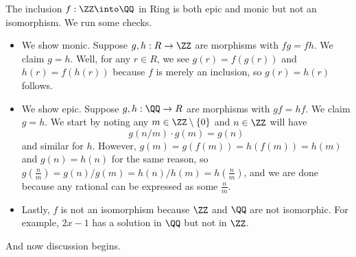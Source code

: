 \begin{ex}
	The inclusion $f:\ZZ\into\QQ$ in $\mathrm{Ring}$ is both epic and monic but not an isomorphism. We run some checks.
	\begin{itemize}
		\item We show monic. Suppose $g,h:R\to\ZZ$ are morphisms with $fg=fh.$ We claim $g=h$. Well, for any $r\in R$, we see $g(r)=f(g(r))$ and $h(r)=f(h(r))$ because $f$ is merely an inclusion, so $g(r)=h(r)$ follows.
		\item We show epic. Suppose $g,h:\QQ\to R$ are morphisms with $gf=hf$. We claim $g=h$. We start by noting any $m\in\ZZ\setminus\{0\}$ and $n\in\ZZ$ will have
		\[g\left(n/m\right)\cdot g(m)=g(n)\]
		and similar for $h$. However, $g(m)=g(f(m))=h(f(m))=h(m)$ and $g(n)=h(n)$ for the same reason, so $g\left(\frac nm\right)=g(n)/g(m)=h(n)/h(m)=h\left(\frac nm\right)$, and we are done because any rational can be expressed as some $\frac nm$.
		\item Lastly, $f$ is not an isomorphism because $\ZZ$ and $\QQ$ are not isomorphic. For example, $2x-1$ has a solution in $\QQ$ but not in $\ZZ$.
	\end{itemize}
\end{ex}
And now discussion begins.